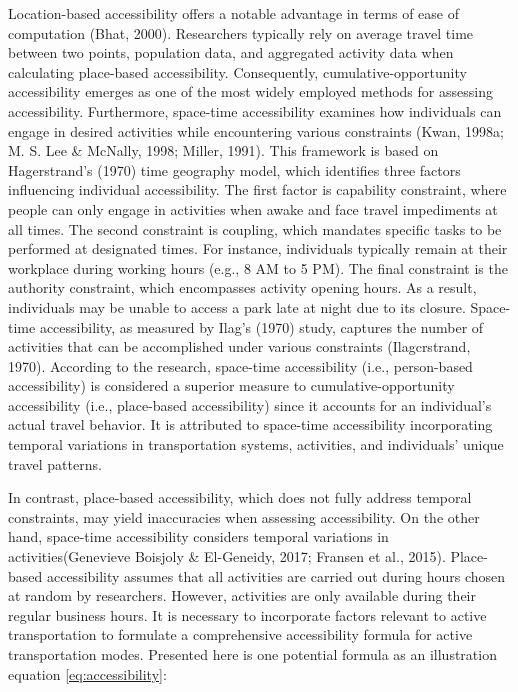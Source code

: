 \documentclass[
11pt, %
oneside, %
english, %
singlespacing, %
]{macthesis} %
\begin{document}
Location-based accessibility offers a notable advantage in terms of ease of computation (Bhat, 2000). Researchers typically rely on average travel time between two points, population data, and aggregated activity data when calculating place-based accessibility. Consequently, cumulative-opportunity accessibility emerges as one of the most widely employed methods for assessing accessibility. Furthermore, space-time accessibility examines how individuals can engage in desired activities while encountering various constraints (Kwan, 1998a; M. S. Lee \& McNally, 1998; Miller, 1991). This framework is based on Hagerstrand's (1970) time geography model, which identifies three factors influencing individual accessibility. The first factor is capability constraint, where people can only engage in activities when awake and face travel impediments at all times. The second constraint is coupling, which mandates specific tasks to be performed at designated times. For instance, individuals typically remain at their workplace during working hours (e.g., 8 AM to 5 PM). The final constraint is the authority constraint, which encompasses activity opening hours. As a result, individuals may be unable to access a park late at night due to its closure. Space-time accessibility, as measured by Ilag's (1970) study, captures the number of activities that can be accomplished under various constraints (Ilagcrstrand, 1970). According to the research, space-time accessibility (i.e., person-based accessibility) is considered a superior measure to cumulative-opportunity accessibility (i.e., place-based accessibility) since it accounts for an individual's actual travel behavior. It is attributed to space-time accessibility incorporating temporal variations in transportation systems, activities, and individuals' unique travel patterns.

In contrast, place-based accessibility, which does not fully address temporal constraints, may yield inaccuracies when assessing accessibility. On the other hand, space-time accessibility considers temporal variations in activities(Genevieve Boisjoly \& El-Geneidy, 2017; Fransen et al., 2015). Place-based accessibility assumes that all activities are carried out during hours chosen at random by researchers. However, activities are only available during their regular business hours. It is necessary to incorporate factors relevant to active transportation to formulate a comprehensive accessibility formula for active transportation modes. Presented here is one potential formula as an illustration equation \eqref{eq:accessibility}:
\end{document}
